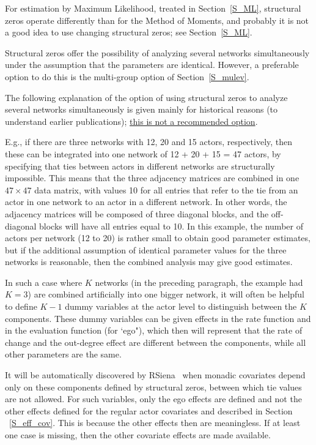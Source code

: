 \documentclass[a4paper,fleqn,11pt]{article}
\newcommand{\+}{\, + \,}
\newcommand{\RS}{{\sf \textsf{RSiena} }}
\begin{document}
For estimation by Maximum Likelihood, treated in Section~\ref{S_ML},
structural zeros operate differently than for the Method of Moments,
and probably it is not a good idea to use changing
structural zeros; see Section~\ref{S_ML}.
\bigskip

Structural zeros offer the possibility of analyzing several
networks simultaneously under the assumption that the parameters
are identical.
However, a preferable option to do this is
the multi-group option of Section~\ref{S_mulev}.

The following explanation of the option of using structural zeros
to analyze several networks simultaneously is given mainly
for historical reasons (to understand earlier publications);
\underline{this is not a recommended option}.

E.g., if there are three networks with 12, 20 and
15 actors, respectively, then these can be integrated into one
network of 12 + 20 + 15 = 47 actors, by specifying that ties
between actors in different networks are structurally impossible.
This means that the three adjacency matrices are combined in one
$47 \times 47$ data matrix, with values 10 for all entries that
refer to the tie from an actor in one network to an actor in a
different network. In other words, the adjacency matrices will be
composed of three diagonal blocks, and the off-diagonal blocks
will have all entries equal to 10. In this example, the number of
actors per network (12 to 20) is rather small to obtain good
parameter estimates, but if the additional assumption of identical
parameter values for the three networks is reasonable, then the
combined analysis may give good estimates.

In such a case where $K$ networks (in the preceding paragraph, the
example had $K = 3$) are combined artificially into one bigger
network, it will often be helpful to define $K-1$ dummy variables
at the actor level to distinguish between the $K$ components.
These dummy variables can be given effects in the rate function
and in the evaluation function (for `ego"), which then will
represent that the rate of change and the out-degree effect are
different between the components, while all other parameters are
the same.

It will be automatically discovered by \RS\ when monadic covariates
depend only on these components defined by structural zeros,
between which tie values are not allowed.
For such variables, only the ego effects are defined
and not the other effects defined for the regular
actor covariates and described in Section ~\ref{S_eff_cov}.
This is because the other effects then are meaningless.
If at least one case is missing,
then the other covariate effects are made available.
\end{document}
